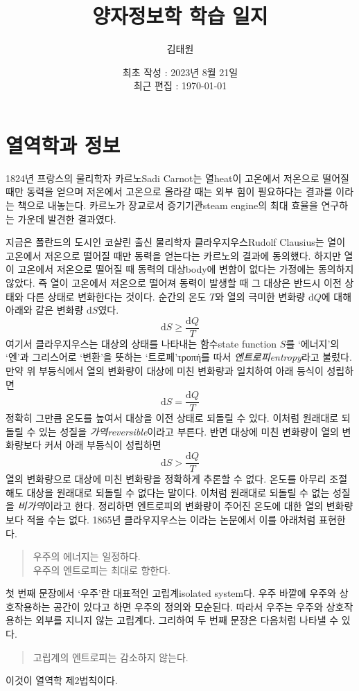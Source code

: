 \documentclass[a4paper,chapter,atbegshi]{oblivoir}
\title{양자정보학 학습 일지}
\author{김태원}
\date{최초 작성 : 2023년 8월 21일 \\ 최근 편집 : \today}
\begin{document}
\maketitle

\chapter{열역학과 정보}
1824년 프랑스의 물리학자 카르노{\tiny Sadi Carnot}는 열{\tiny heat}이 고온에서
저온으로 떨어질 때만 동력을 얻으며 저온에서 고온으로 올라갈 때는 외부 힘이
필요하다는 결과를 이라는 책으로 내놓는다. 카르노가 장교로서 증기기관{\tiny steam engine}의
최대 효율을 연구하는 가운데 발견한 결과였다.

지금은 폴란드의 도시인 코샬린 출신 물리학자 클라우지우스{\tiny Rudolf Clausius}는
열이 고온에서 저온으로 떨어질 때만 동력을 얻는다는 카르노의 결과에 동의했다. 
하지만 열이 고온에서 저온으로 떨어질 때 동력의 대상{\tiny body}에 변함이 없다는
가정에는 동의하지 않았다. 즉 열이 고온에서 저온으로 떨어져 동력이 발생할 때 그
대상은 반드시 이전 상태와 다른 상태로 변화한다는 것이다. 순간의 온도 $T$와 열의
극미한 변화량 $\textrm{d}Q$에 대해 아래와 같은 변화량 $\textrm{d}S$였다. 
\begin{equation}
  \textrm{d}S \geq \frac{\textrm{d}Q}{T}
\end{equation}
여기서 클라우지우스는 대상의 상태를 나타내는 함수{\tiny state function} $S$를
`에너지'의 `엔'과 그리스어로 `변환'을 뜻하는 `트로페'{\tiny τροπή}를 따서
\emph{엔트로피\tiny entropy}라고 불렀다. 만약 위 부등식에서 열의 변화량이
대상에 미친 변화량과 일치하여 아래 등식이 성립하면  
\begin{equation}
  \textrm{d}S = \frac{\textrm{d}Q}{T}
\end{equation}
정확히 그만큼 온도를 높여서 대상을 이전 상태로 되돌릴 수 있다. 이처럼
원래대로 되돌릴 수 있는 성질을 \emph{가역\tiny reversible}이라고 부른다.
반면 대상에 미친 변화량이 열의 변화량보다 커서 아래 부등식이 성립하면
\begin{equation}
  \textrm{d}S > \frac{\textrm{d}Q}{T}
\end{equation}
열의 변화량으로 대상에 미친 변화량을 정확하게 추론할 수 없다. 온도를
아무리 조절해도 대상을 원래대로 되돌릴 수 없다는 말이다. 이처럼 원래대로
되돌릴 수 없는 성질을 \emph{비가역}이라고 한다. 정리하면 엔트로피의
변화량이 주어진 온도에 대한 열의 변화량보다 적을 수는 없다. 1865년
클라우지우스는 이라는 논문에서 이를 아래처럼 표현한다.
\begin{quote}
  우주의 에너지는 일정하다. \\
  우주의 엔트로피는 최대로 향한다.
\end{quote}
첫 번째 문장에서 `우주'란 대표적인 고립계{\tiny isolated system}다. 우주
바깥에 우주와 상호작용하는 공간이 있다고 하면 우주의 정의와 모순된다. 
따라서 우주는 우주와 상호작용하는 외부를 지니지 않는 고립계다. 그리하여
두 번째 문장은 다음처럼 나타낼 수 있다.
\begin{quote}
  고립계의 엔트로피는 감소하지 않는다.
\end{quote}
이것이 열역학 제2법칙이다.
\end{document}
